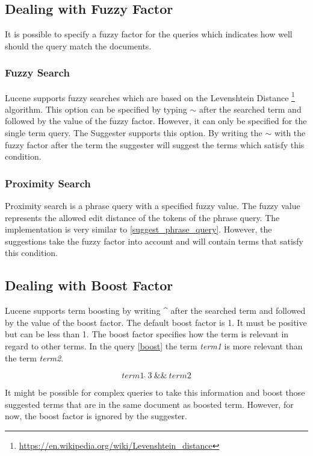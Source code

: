 \subsection{Dealing with Fuzzy Factor}
\label{fuzzy}
It is possible to specify a fuzzy factor for the queries which indicates how well should the query match the documents.

\subsubsection{Fuzzy Search}
Lucene supports fuzzy searches which are based on the Levenshtein Distance
\footnote{\url{https://en.wikipedia.org/wiki/Levenshtein_distance}} algorithm. This option can be specified by typing
$\sim$ after the searched term and followed by the value of the fuzzy factor. However, it can only be specified for the
single term query. The Suggester supports this option. By writing the $\sim$ with the fuzzy factor after the term the
suggester will suggest the terms which satisfy this condition.

\subsubsection{Proximity Search}
Proximity search is a phrase query with a specified fuzzy value. The fuzzy value represents the allowed edit distance of the
tokens of the phrase query. The implementation is very similar to \ref{suggest_phrase_query}. However, the suggestions
take the fuzzy factor into account and will contain terms that satisfy this condition.

\subsection{Dealing with Boost Factor}
Lucene supports term boosting by writing \textbf{\^} after the searched term and followed by the value of the boost factor.
The default boost factor is 1. It must be positive but can be less than 1. The boost factor specifies how the term is relevant
in regard to other terms. In the query \ref{boost} the term \textit{term1} is more relevant than the term \textit{term2}.

\begin{equation}
\label{boost}
term1\ \hat{}\ 3\ \&\&\ term2
\end{equation}

It might be possible for complex queries to take this information and boost those suggested terms that are in the same
document as boosted term. However, for now, the boost factor is ignored by the suggester.

